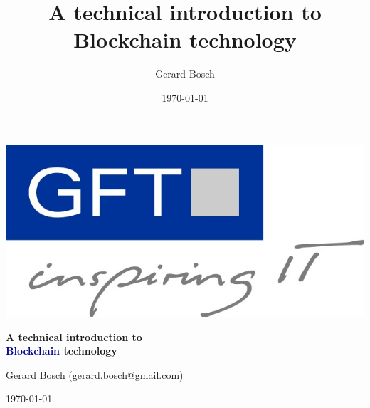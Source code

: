 \documentclass[notitlepage, usenames,dvipsnames]{beamer}
\title[Intro to Blockchain Technology]{A technical introduction to Blockchain technology}
\author[Gerard Bosch]{Gerard Bosch}
\institute{\email{gerard.bosch@gmail.com}}
\date{\today}
\begin{document}

    \begin{frame}
        \begin{center}
            
            
            \includegraphics[scale=0.15]{../img/gft.jpg}

            \vspace{1em}
            {\huge \bfseries \textcolor{MidnightBlue!100!bg}{ A technical introduction to\\[3mm] \textcolor{DarkBlue}{Blockchain} technology }} \\[3mm]

            \vspace{1em}{\Large\textcolor{red}{-- Preview Version --}}\vspace{-1em}

            \vspace{1cm}
            Gerard Bosch (gerard.bosch@gmail.com)

            \vspace{0.8cm}\today
        \end{center}
    \end{frame}



\end{document}
